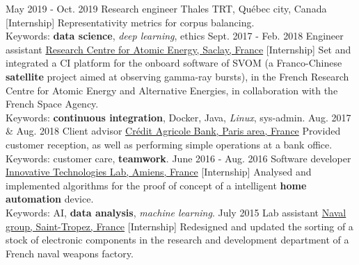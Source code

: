 \documentclass[a4paper]{twentysecondcv} %
\begin{document}
\begin{twenty} %
    \twentyitem
        {May 2019 -}
        {Oct. 2019}
        {Research engineer}
        {Thales TRT, Québec city, Canada}
        {}
        {{[Internship]} Representativity metrics for corpus balancing.\\Keywords: \textbf{data science}, \textit{deep learning}, ethics}
    \twentyitem
    	{Sept. 2017 -}
		{Feb. 2018}
        {Engineer assistant}
        {\href{http://irfu.cea.fr/}{Research Centre for Atomic Energy, Saclay, France}}
        {}
        {{[Internship]} Set and integrated a CI platform for the onboard software of SVOM (a Franco-Chinese \textbf{satellite} project aimed at observing gamma-ray bursts), in the French Research Centre for Atomic Energy and Alternative Energies, in collaboration with the French Space Agency.\\Keywords: \textbf{continuous integration}, Docker, Java, \textit{Linux}, sys-admin.}
    \twentyitem
        {Aug. 2017 \&}
                {Aug. 2018}
        {Client advisor}
        {\href{https://ca-paris.com/}{Crédit Agricole Bank, Paris area, France}}
        {}
        {Provided customer reception, as well as performing simple operations at a bank office.\\Keywords: customer care, \textbf{teamwork}.}
	\twentyitem
    	{June 2016 -}
		{Aug. 2016}
        {Software developer}
        {\href{http://lti-picardie.fr/}{Innovative Technologies Lab, Amiens, France}}
        {}
        {{[Internship]} Analysed and implemented algorithms for the proof of concept of a intelligent \textbf{home automation} device.\\Keywords: AI, \textbf{data analysis}, \textit{machine learning}.}
     \twentyitem
   		{July 2015}
		{}
        {Lab assistant}
        {\href{https://www.naval-group.com/fr/}{Naval group, Saint-Tropez, France}}
        {}
        {{[Internship]} Redesigned and updated the sorting of a stock of electronic components in the research and development department of a French naval weapons factory.}
\end{twenty}

\end{document}

